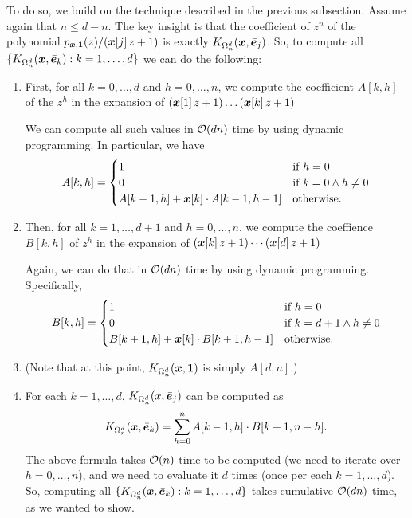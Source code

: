 To do so, we build on the technique described in the previous subsection. Assume again that $n \le d-n$. The key insight is that the coefficient of $z^n$ of the polynomial $p_{\bm{x},\bm{1}}(z) / (\bm{x}[j]\, z + 1)$ is exactly $K_{{\Omega^d_n}}(\bm{x}, \bar{\bm{e}}_j)$. So, to compute all $\{K_{{\Omega^d_n}}(\bm{x}, \bar{\bm{e}}_k): k =1,\dots,d\}$ we can do the following:
\begin{enumerate}[nosep,left=1mm]
    \item First, for all $k = 0,\dots,d$ and $h=0,\dots,n$, we compute the coefficient $A[k,h]$ of the $z^h$ in the expansion of $(\bm{x}[1]\,z+1)\dots (\bm{x}[k]\,z +1)$

          We can compute all such values in $\mathcal{O}(dn)$ time by using dynamic programming. In particular, we have
          \[
              A[k,h] = \begin{cases}
                  1                                 & \text{if }h=0               \\
                  0                                 & \text{if }k=0 \land h\neq 0 \\
                  A[k-1,h] + \bm{x}[k]\cdot A[k-1,h-1] & \text{otherwise.}
              \end{cases}
          \]

    \item Then, for all $k=1, \dots, d+1$ and $h=0,\dots,n$, we compute the coeffience $B[k,h]$ of $z^h$ in the expansion of $(\bm{x}[k]\,z+1)\cdots (\bm{x}[d]\, z+1)$

          Again, we can do that in $\mathcal{O}(dn)$ time by using dynamic programming. Specifically,
          \[
              B[k,h] = \begin{cases}
                  1                                 & \text{if }h=0                \\
                  0                                 & \text{if }k=d+1\land h\neq 0 \\
                  B[k+1,h] + \bm{x}[k]\cdot B[k+1,h-1] & \text{otherwise.}
              \end{cases}
          \]

    \item (Note that at this point, $K_{{\Omega^d_n}}(\bm{x},\mathbf{1})$ is simply $A[d,n]$.)
    \item For each $k = 1,\dots,d$, $K_{{\Omega^d_n}}(x, \bar{\bm{e}}_j)$ can be computed as
          \[
              K_{{\Omega^d_n}}(\bm{x},\bar{\bm{e}}_k) = \sum_{h=0}^n A[k-1,h]\cdot B[k+1,n-h].
          \]
          The above formula takes $\mathcal{O}(n)$ time to be computed (we need to iterate over $h=0,\dots,n$), and we need to evaluate it $d$ times (once per each $k=1,\dots,d$). So, computing all $\{K_{{\Omega^d_n}}(\bm{x},\bar{\bm{e}}_k): k =1,\dots,d\}$ takes cumulative $\mathcal{O}(dn)$ time, as we wanted to show.
\end{enumerate}


